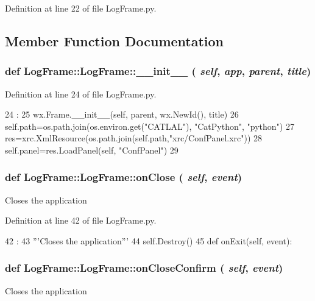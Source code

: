 Definition at line 22 of file LogFrame.py.

\subsection{Member Function Documentation}
\hypertarget{classLogFrame_1_1LogFrame_a0a15c587216b88be327898693793c55e}{
\subsubsection[{\_\-\_\-init\_\-\_\-}]{\setlength{\rightskip}{0pt plus 5cm}def LogFrame::LogFrame::\_\-\_\-init\_\-\_\- ( {\em self}, \/   {\em app}, \/   {\em parent}, \/   {\em title})}}
\label{classLogFrame_1_1LogFrame_a0a15c587216b88be327898693793c55e}


Definition at line 24 of file LogFrame.py.


\begin{DoxyCode}
24                                        : 
25         wx.Frame.__init__(self, parent, wx.NewId(), title)
26         self.path=os.path.join(os.environ.get("CATLAL"), "CatPython", "python")
27         res=xrc.XmlResource(os.path.join(self.path,"xrc/ConfPanel.xrc"))
28         self.panel=res.LoadPanel(self, "ConfPanel")
29 
\end{DoxyCode}
\hypertarget{classLogFrame_1_1LogFrame_aed95678395171c7b69755b8391c1bb74}{
\subsubsection[{onClose}]{\setlength{\rightskip}{0pt plus 5cm}def LogFrame::LogFrame::onClose ( {\em self}, \/   {\em event})}}
\label{classLogFrame_1_1LogFrame_aed95678395171c7b69755b8391c1bb74}
\begin{DoxyVerb}Closes the application\end{DoxyVerb}
 

Definition at line 42 of file LogFrame.py.


\begin{DoxyCode}
42                             :
43         '''Closes the application'''
44         self.Destroy()
45 
    def onExit(self, event):
\end{DoxyCode}
\hypertarget{classLogFrame_1_1LogFrame_ab0f6e78490bf48c51b61d44ac025ec6e}{
\subsubsection[{onCloseConfirm}]{\setlength{\rightskip}{0pt plus 5cm}def LogFrame::LogFrame::onCloseConfirm ( {\em self}, \/   {\em event})}}
\label{classLogFrame_1_1LogFrame_ab0f6e78490bf48c51b61d44ac025ec6e}
\begin{DoxyVerb}Closes the application\end{DoxyVerb}
 

